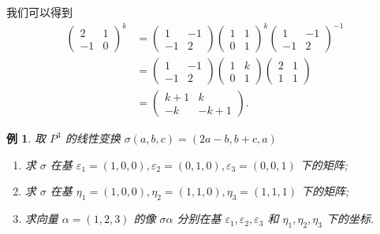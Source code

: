 \documentclass[13pt]{beamer}
\newtheorem{exa}{例}
\begin{document}
\begin{frame}


我们可以得到
\[
\begin{aligned}
\left(\begin{array}{rr}
2 & 1 \\
-1 & 0
\end{array}\right)^{k} &=\left(\begin{array}{rr}
1 & -1 \\
-1 & 2
\end{array}\right)\left(\begin{array}{rr}
1 & 1 \\
0 & 1
\end{array}\right)^{k}\left(\begin{array}{rr}
1 & -1 \\
-1 & 2
\end{array}\right)^{-1} \\
&=\left(\begin{array}{rr}
1 & -1 \\
-1 & 2
\end{array}\right)\left(\begin{array}{rr}
1 & k \\
0 & 1
\end{array}\right)\left(\begin{array}{rr}
2 & 1 \\
1 & 1
\end{array}\right) \\
&=\left( \begin{array}{cc}
k+1 & k \\
-k & -k+1
\end{array}\right).
\end{aligned}
\]

\end{frame}

\begin{frame}
\begin{exa}\label{ex-1}
	取 $P^{3}$ 的线性变换 $\sigma(a, b, c)=(2 a-b, b+c, a)$
\begin{enumerate}

\item 求 $\sigma$ 在基 $\varepsilon_{1}=(1,0,0), \varepsilon_{2}=(0,1,0), \varepsilon_{3}=(0,0,1)$ 下的矩阵;
\item 求 $\sigma$ 在基 $\eta_{1}=(1,0,0), \eta_{2}=(1,1,0), \eta_{3}=(1,1,1)$ 下的矩阵;
\item 求向量 $\alpha=(1,2,3)$ 的像 $\sigma \alpha$ 分别在基 $\varepsilon_{1}, \varepsilon_{2}, \varepsilon_{3}$ 和 $\eta_{1}, \eta_{2}, \eta_{3}$ 下的坐标.	
\end{enumerate}
\end{exa}
\end{frame}
\end{document}
